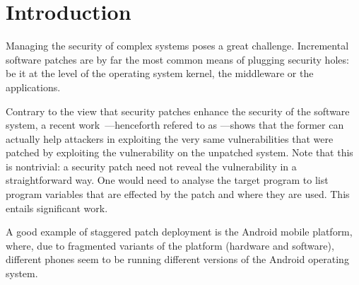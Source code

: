 \section{Introduction} \label{sec:intro}
Managing the security of complex systems poses a great challenge. Incremental software patches are by far the most common means of plugging security holes: be it at the level of the operating system kernel, the middleware or the applications.

Contrary to the view that security patches enhance the security of the software system, a recent work~\cite{apeg08}---henceforth refered to as \ap---shows that the former can actually help attackers in exploiting the very same vulnerabilities that were patched by exploiting the vulnerability on the unpatched system. Note that this is nontrivial: a security patch need not reveal the vulnerability in a straightforward way. One would need to analyse the target program to list program variables that are effected by the patch and where they are used. This entails significant work.


A good example of staggered patch deployment is the Android mobile platform, where, due to fragmented variants of the platform (hardware and software), different phones seem to be running different versions of the Android operating system.